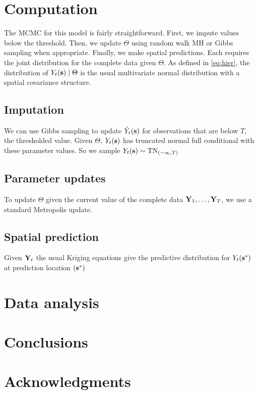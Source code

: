 \documentclass[11pt]{article}
\begin{document}
\section{Computation}\label{s:comp}
The MCMC for this model is fairly straightforward.
First, we impute values below the threshold.
Then, we update $\Theta$ using random walk MH or Gibbs sampling when appropriate.
Finally, we make spatial predictions.
Each requires the joint distribution for the complete data given $\Theta$.
As defined in \ref{eq:hier}, the distribution of $Y_t(\mbox{\bf s}) \mid \Theta$ is the usual multivariate normal distribution with a \Matern spatial covariance structure.

\subsection{Imputation}\label{s:impute}
We can use Gibbs sampling to update ${\tilde Y}_t(\mbox{\bf s})$ for observations that are below $T$, the thresholded value. Given $\Theta$, $Y_t(\mbox{\bf s})$ has truncated normal full conditional with these parameter values.
So we sample $Y_t(\mbox{\bf s}) \sim \text{TN}_{(-\infty, T)}$

\subsection{Parameter updates}\label{s:params}
To update $\Theta$ given the current value of the complete data $\mbox{\bf Y}_1, \ldots, \mbox{\bf Y}_T$, we use a standard Metropolis update.

\subsection{Spatial prediction}\label{s:pred}
Given $\mbox{\bf Y}_t$ the usual Kriging equations give the predictive distribution for $Y_t(\mbox{\bf s}^*)$ at prediction location $(\mbox{\bf s}^*)$


\section{Data analysis}\label{s:analysis}


\section{Conclusions}\label{s:con}

\section*{Acknowledgments}
\end{document}
